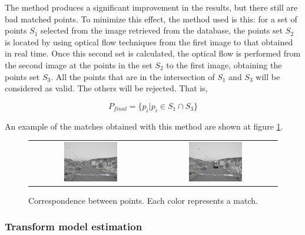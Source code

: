 The \cite{bouguet2001pyramidal} method produces a significant improvement in the results, but there still are bad matched points. To minimize this effect, the method used is this: for a set of points $S_1$ selected from the image retrieved from the database, the points set $S_2$ is located by using optical flow techniques from the first image to that obtained in real time. Once this second set is calculated, the optical flow is performed from the second image at the points in the set $S_2$ to the first image, obtaining the points set $S_3$. All the points that are in the intersection of $S_1$ and $S_3$ will be considered as valid. The others will be rejected. That is,

\begin{equation}\label{eq:cp01_rejected_points}
P_{final} = \{ p_i | p_i \in S_1 \cap S_3 \}
\end{equation}

An example of the matches obtained with this method are shown at figure \ref{fig:cp01_matches}.

\begin{figure}[h!]
\begin{tabular}{cc}
\includegraphics[width=0.45\textwidth]{matches1}\label{fig:cp01_matches_1} &
\includegraphics[width=0.45\textwidth]{matches2}\label{fig:cp01_matches_2}
\end{tabular}
\caption{Correspondence between points. Each color represents a match.}\label{fig:cp01_matches}
\end{figure}

\subsubsection{Transform model estimation}\label{ch:chapter01_01_02_03}

